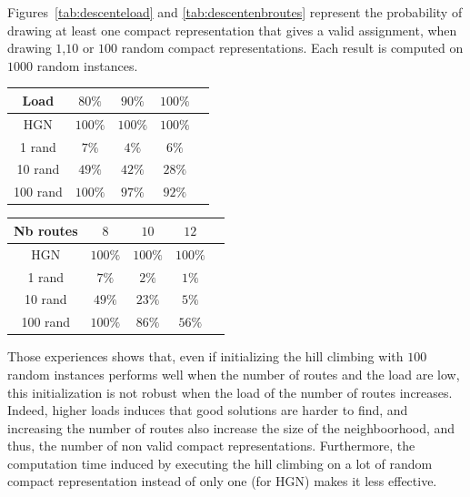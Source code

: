 \documentclass[english]{article}
\begin{document}
Figures~\ref{tab:descenteload} and \ref{tab:descentenbroutes} represent the probability of drawing at least one compact representation that gives a valid assignment, when drawing $1$,$10$ or $100$ random compact representations. Each result is computed on $1000$ random instances.

\begin{minipage}[c]{.45\linewidth}
\vspace{-0.4cm}
\begin{tabular}{ |c|c|c|c|c| }
\hline
    Load & $80\%$& $90\%$ & $100\%$\\
    \hline
    HGN & $100\%$ & $100\%$& $100\%$ \\
    1 rand & $7\%$ & $4\%$& $6\%$\\
   10 rand & $49\%$& $42\%$& $28\%$\\
   100 rand & $100\%$ & $97\%$& $92\%$\\
    \hline
 \end{tabular}
 \label{tab:descenteload}
\vfill
 \end{minipage}
 \hfill
\begin{minipage}[c]{.45\linewidth}
\vfill
\begin{tabular}{ |c|c|c|c|c| }
\hline
    Nb routes & $8$& $10$ & $12$\\
    \hline
    HGN & $100\%$ & $100\%$& $100\%$ \\
    1 rand & $7\%$ & $2\%$& $1\%$\\
   10 rand & $49\%$& $23\%$& $5\%$\\
   100 rand & $100\%$ & $86\%$& $56\%$\\
    \hline
 \end{tabular}
 \label{tab:descentenbroutes}
\vfill
\end{minipage}

Those experiences shows that, even if initializing the hill climbing with $100$ random instances performs well when the number of routes and the load are low, this initialization is not robust when the load of the number of routes increases. Indeed, higher loads induces that good solutions are harder to find, and increasing the number of routes also increase the size of the neighboorhood, and thus, the number of non valid compact representations. Furthermore, the computation time induced by executing the hill climbing on a lot of random compact representation instead of only one (for HGN) makes it less effective.
\end{document}
